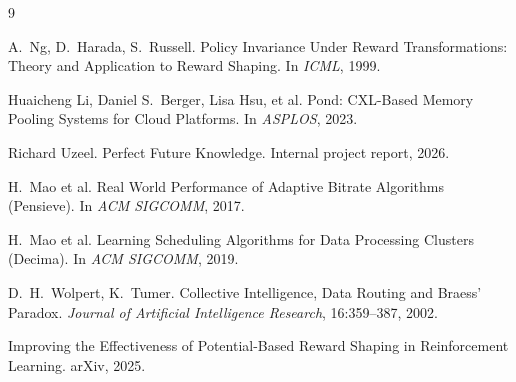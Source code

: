 \documentclass[11pt]{article}
\begin{document}
\begin{thebibliography}{9}

A.~Ng, D.~Harada, S.~Russell.
\newblock Policy Invariance Under Reward Transformations: Theory and Application
  to Reward Shaping.
\newblock In \textit{ICML}, 1999.

Huaicheng Li, Daniel S.\ Berger, Lisa Hsu, et al.
\newblock Pond: {CXL}-Based Memory Pooling Systems for Cloud Platforms.
\newblock In \textit{ASPLOS}, 2023.

Richard Uzeel.
\newblock Perfect Future Knowledge.
\newblock Internal project report, 2026.

H.~Mao et al.
\newblock Real World Performance of Adaptive Bitrate Algorithms (Pensieve).
\newblock In \textit{ACM SIGCOMM}, 2017.

H.~Mao et al.
\newblock Learning Scheduling Algorithms for Data Processing Clusters (Decima).
\newblock In \textit{ACM SIGCOMM}, 2019.

D.~H.~Wolpert, K.~Tumer.
\newblock Collective Intelligence, Data Routing and Braess' Paradox.
\newblock \textit{Journal of Artificial Intelligence Research}, 16:359--387, 2002.

Improving the Effectiveness of Potential-Based Reward Shaping in Reinforcement
  Learning.
\newblock arXiv, 2025.

\end{thebibliography}
\end{document}
